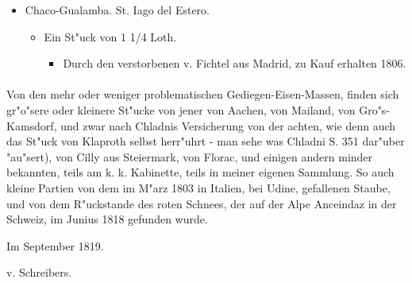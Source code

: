 \documentclass[a4paper, 11pt, oneside, polutonikogreek, german]{article}
\begin{document}
\begin{itemize}
\begin{itemize}
\begin{itemize}
        \end{itemize}
    \end{itemize}
    \item Chaco-Gualamba. St. Iago del Estero.
    \begin{itemize}
        \item Ein St"uck von 1 1/4 Loth.
        \begin{itemize}
            \item Durch den verstorbenen v. Fichtel aus Madrid, zu Kauf erhalten 1806.
        \end{itemize}
    \end{itemize}
\end{itemize}
\paragraph{}
Von den mehr oder weniger problematischen Gediegen-Eisen-Massen, finden sich gr"o"sere oder kleinere St"ucke von jener von Aachen, von Mailand, von Gro"s-Kamsdorf, und zwar nach Chladnis Versicherung von der achten, wie denn auch das St"uck von Klaproth selbst herr"uhrt - man sehe was Chladni S. 351 dar"uber "au"sert), von Cilly aus Steiermark, von Florac, und einigen andern minder bekannten, teils am k. k. Kabinette, teils in meiner eigenen Sammlung. So auch kleine Partien von dem im M"arz 1803 in Italien, bei Udine, gefallenen Staube, und von dem R"uckstande des roten Schnees, der auf der Alpe Anceindaz in der Schweiz, im Junius 1818 gefunden wurde.

Im September 1819.

\hfill\begin{minipage}{0.45\linewidth}
v. Schreibers.
\end{minipage}
\clearpage
\end{document}
